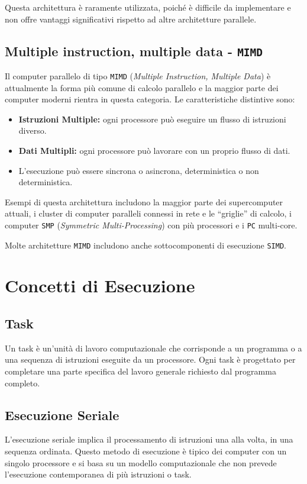 Questa architettura è raramente utilizzata, poiché è difficile da implementare
e non offre vantaggi significativi rispetto ad altre architetture parallele.

\subsection{Multiple instruction, multiple data - \texttt{MIMD}}
Il computer parallelo di tipo \texttt{MIMD} (\textit{Multiple Instruction, Multiple Data})
è attualmente la forma più comune di calcolo parallelo e la maggior parte
dei computer moderni rientra in questa categoria. Le caratteristiche distintive
sono:

\begin{itemize}
    \item \textbf{Istruzioni Multiple:} ogni processore può eseguire un flusso
    di istruzioni diverso.
    \item \textbf{Dati Multipli:} ogni processore può lavorare con un
    proprio flusso di dati.
    \item L'esecuzione può essere sincrona o asincrona, deterministica o
    non deterministica.
\end{itemize}

Esempi di questa architettura includono la maggior parte dei supercomputer attuali,
i cluster di computer paralleli connessi in rete e le ``griglie'' di calcolo,
i computer \texttt{SMP} (\textit{Symmetric Multi-Processing}) con più processori
e i \texttt{PC} multi-core.
\begin{nota}
    Molte architetture \texttt{MIMD} includono anche sottocomponenti di esecuzione
    \texttt{SIMD}.
\end{nota}

\section{Concetti di Esecuzione}

\subsection{Task}
Un task è un'unità di lavoro computazionale che corrisponde a un programma o a una sequenza di istruzioni eseguite da un processore. Ogni task è progettato per completare una parte specifica del lavoro generale richiesto dal programma completo.

\subsection{Esecuzione Seriale}
L'esecuzione seriale implica il processamento di istruzioni una alla volta, in una sequenza ordinata. Questo metodo di esecuzione è tipico dei computer con un singolo processore e si basa su un modello computazionale che non prevede l'esecuzione contemporanea di più istruzioni o task.

